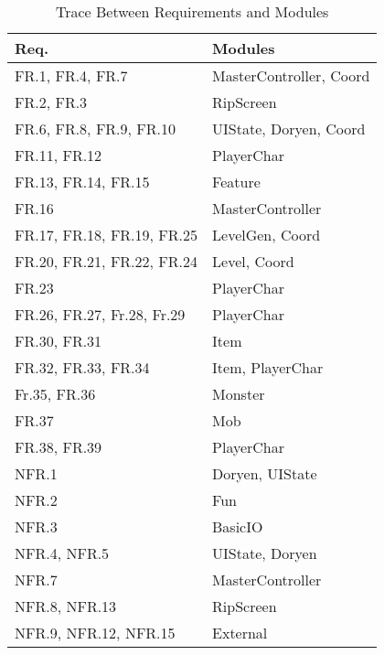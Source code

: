 \documentclass[12pt, titlepage]{article}
\begin{document}
    \begin{table}[H]
        \centering
        \begin{tabular}{p{} p{}}

            \toprule
            \textbf{Req.} & \textbf{Modules}\\
            \midrule

            FR.1, FR.4, FR.7 & MasterController, Coord\\
            FR.2, FR.3 & RipScreen\\
            FR.6, FR.8, FR.9, FR.10 & UIState, Doryen, Coord\\
            FR.11, FR.12 & PlayerChar\\
            FR.13, FR.14, FR.15 & Feature\\
            FR.16 & MasterController\\
            FR.17, FR.18, FR.19, FR.25 & LevelGen, Coord\\
            FR.20, FR.21, FR.22, FR.24 & Level, Coord\\
            FR.23 & PlayerChar\\
            FR.26, FR.27, Fr.28, Fr.29 & PlayerChar\\
            FR.30, FR.31 & Item\\
            FR.32, FR.33, FR.34 & Item, PlayerChar\\
            Fr.35, FR.36 & Monster\\
            FR.37 & Mob\\
            FR.38, FR.39 & PlayerChar\\
            \midrule
            NFR.1 & Doryen, UIState\\
            NFR.2 & Fun\\
            NFR.3 & BasicIO\\
            NFR.4, NFR.5 & UIState, Doryen\\
            NFR.7 & MasterController\\
            NFR.8, NFR.13 & RipScreen\\
            NFR.9, NFR.12, NFR.15 & External\\

            \bottomrule
        \end{tabular}

        \caption{Trace Between Requirements and Modules}
        \label{TblRT}
    \end{table}
\end{document}
